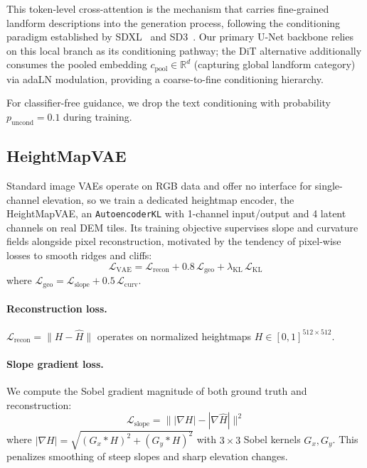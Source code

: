 \documentclass[review]{vgtc}                 %
\begin{document}
This token-level cross-attention is the mechanism that carries fine-grained landform descriptions into the generation process, following the conditioning paradigm established by SDXL~\cite{SDXL:2024} and SD3~\cite{SD3:2024}.
Our primary U-Net backbone relies on this local branch as its conditioning pathway; the DiT alternative additionally consumes the pooled embedding $c_{\text{pool}} \in \mathbb{R}^{d}$ (capturing global landform category) via adaLN modulation, providing a coarse-to-fine conditioning hierarchy.

For classifier-free guidance, we drop the text conditioning with probability $p_{\text{uncond}} = 0.1$ during training.

\subsection{HeightMapVAE}
\label{sec:heightmap_vae}

Standard image VAEs operate on RGB data and offer no interface for single-channel elevation, so we train a dedicated heightmap encoder, the HeightMapVAE, an \texttt{AutoencoderKL} with 1-channel input/output and 4 latent channels on real DEM tiles.
Its training objective supervises slope and curvature fields alongside pixel reconstruction, motivated by the tendency of pixel-wise losses to smooth ridges and cliffs:
\begin{equation}
  \mathcal{L}_{\text{VAE}} = \mathcal{L}_{\text{recon}} + 0.8\,\mathcal{L}_{\text{geo}} + \lambda_{\text{KL}}\,\mathcal{L}_{\text{KL}}
  \label{eq:vae_loss}
\end{equation}
where $\mathcal{L}_{\text{geo}} = \mathcal{L}_{\text{slope}} + 0.5\,\mathcal{L}_{\text{curv}}$.

\paragraph{Reconstruction loss.}
$\mathcal{L}_{\text{recon}} = \| H - \hat{H} \|$ operates on normalized heightmaps $H \in [0, 1]^{512 \times 512}$.

\paragraph{Slope gradient loss.}
We compute the Sobel gradient magnitude of both ground truth and reconstruction:
\begin{equation}
  \mathcal{L}_{\text{slope}} = \big\| |\nabla H| - |\nabla \hat{H}| \big\|^2
  \label{eq:slope_loss}
\end{equation}
where $|\nabla H| = \sqrt{(G_x * H)^2 + (G_y * H)^2}$ with $3 \times 3$ Sobel kernels $G_x, G_y$.
This penalizes smoothing of steep slopes and sharp elevation changes.
\end{document}
